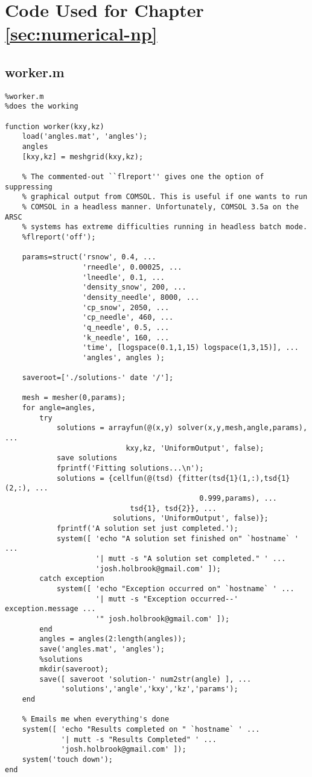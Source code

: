 \chapter{Code Used for Chapter \ref{sec:numerical-np}}
\label{apx:numerical-np}

\section{worker.m}
\small
\begin{verbatim}
%worker.m
%does the working

function worker(kxy,kz)
    load('angles.mat', 'angles');
    angles
    [kxy,kz] = meshgrid(kxy,kz);

    % The commented-out ``flreport'' gives one the option of suppressing
    % graphical output from COMSOL. This is useful if one wants to run
    % COMSOL in a headless manner. Unfortunately, COMSOL 3.5a on the ARSC
    % systems has extreme difficulties running in headless batch mode.
    %flreport('off');

    params=struct('rsnow', 0.4, ...
                  'rneedle', 0.00025, ...
                  'lneedle', 0.1, ...
                  'density_snow', 200, ...
                  'density_needle', 8000, ...
                  'cp_snow', 2050, ...
                  'cp_needle', 460, ...
                  'q_needle', 0.5, ...
                  'k_needle', 160, ...
                  'time', [logspace(0.1,1,15) logspace(1,3,15)], ...
                  'angles', angles );

    saveroot=['./solutions-' date '/'];

    mesh = mesher(0,params);
    for angle=angles,
        try
            solutions = arrayfun(@(x,y) solver(x,y,mesh,angle,params), ...
                            kxy,kz, 'UniformOutput', false);
            save solutions
            fprintf('Fitting solutions...\n');
            solutions = {cellfun(@(tsd) {fitter(tsd{1}(1,:),tsd{1}(2,:), ...
                                             0.999,params), ...
                             tsd{1}, tsd{2}}, ...
                         solutions, 'UniformOutput', false)};
            fprintf('A solution set just completed.');
            system([ 'echo "A solution set finished on" `hostname` ' ...
                     '| mutt -s "A solution set completed." ' ...
                     'josh.holbrook@gmail.com' ]);
        catch exception
            system([ 'echo "Exception occurred on" `hostname` ' ...
                     '| mutt -s "Exception occurred--' exception.message ...
                     '" josh.holbrook@gmail.com' ]);
        end
        angles = angles(2:length(angles));
        save('angles.mat', 'angles');
        %solutions
        mkdir(saveroot);
        save([ saveroot 'solution-' num2str(angle) ], ...
             'solutions','angle','kxy','kz','params');
    end

    % Emails me when everything's done
    system([ 'echo "Results completed on " `hostname` ' ...
             '| mutt -s "Results Completed" ' ...
             'josh.holbrook@gmail.com' ]);
    system('touch down');
end
\end{verbatim}
\normalsize


